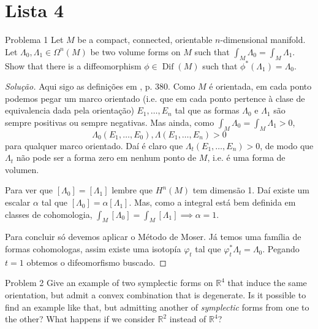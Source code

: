 \vspace{10pt}
\section{Lista 4}

\begin{thing4}{Problema 1}\leavevmode
Let $M$ be a compact, connected, orientable $n$-dimensional manifold. Let $\Lambda_0,\Lambda_1\in\Omega^{n}(M)$ be two volume forms on $M$ such that $\int_{M}\Lambda_0=\int_{M}\Lambda_1$. Show that there is a diffeomorphism $\phi \in \operatorname{Dif}(M)$ such that $\phi^*\left( \Lambda_1 \right) =\Lambda_0$.
\end{thing4}

\begin{proof}[Solução]
Aqui sigo as definições em \cite{lee}, p. 380.  Como $M$ é orientada, em cada ponto podemos pegar um marco orientado (i.e. que em cada ponto pertence à clase de equivalencia dada pela orientação) $E_1,\ldots,E_n$ tal que as formas $\Lambda_0$ e $\Lambda_1$ são sempre positivas ou sempre negativas. Mas ainda, como $\int_{M}\Lambda_0=\int_{M}\Lambda_1>0$,
\[\Lambda_0(E_1,\ldots,E_0),\Lambda(E_1,\ldots,E_n)>0\]
para qualquer marco orientado. Daí é claro que $\Lambda_t(E_1,\ldots,E_n)>0$, de modo que $\Lambda_t$ não pode ser a forma zero em nenhum ponto de $M$, i.e. é uma forma de volumen.

	Para ver que $\left[ \Lambda_0 \right] =\left[ \Lambda_1 \right] $ lembre que $H^{n}(M)$ tem dimensão 1. Daí existe um escalar $\alpha$ tal que $\left[ \Lambda_0 \right] =\alpha \left[ \Lambda_1 \right] $. Mas, como a integral está bem definida em classes de cohomologia, $\int_{M}\left[ \Lambda_0 \right] =\int_{M}\left[ \Lambda_1 \right] \implies \alpha=1$.

Para concluir só devemos aplicar o Método de Moser. Já temos uma família de formas cohomologas, assim existe uma isotopía $ \varphi_t$ tal que $\varphi^*_{t}\Lambda_t=\Lambda_0$. Pegando $t=1$ obtemos o difeomorfismo buscado.
\end{proof}

\begin{thing8}{Problem 2}\leavevmode
	Give an example of two symplectic forms on $\mathbb{R}^{4}$ that induce the same orientation, but admit a convex combination that is degenerate. Is it possible to find an example like that, but admitting another of \textit{symplectic} forms from one to the other? What happens if we consider $\mathbb{R}^{2}$ instead of $\mathbb{R}^{4}$?
\end{thing8}

